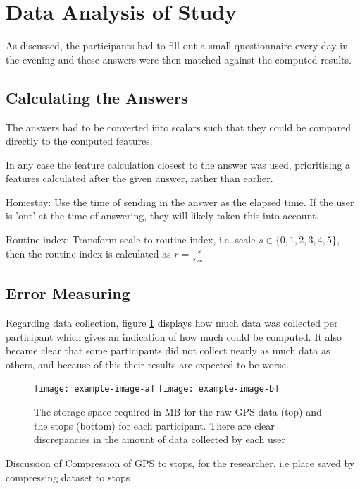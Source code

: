 \section{Data Analysis of Study}
As discussed, the participants had to fill out a small questionnaire every day in the evening and these answers were then matched against the computed results.

\subsection{Calculating the Answers}
The answers had to be converted into scalars such that they could be compared directly to the computed features. 

In any case the feature calculation closest to the answer was used, prioritising a features calculated after the given answer, rather than earlier.

Homestay: Use the time of sending in the answer as the elapsed time. If the user is 'out' at the time of answering, they will likely taken this into account.

Routine index: Transform scale to routine index, i.e. scale $s \in \{0, 1, 2, 3, 4, 5\}$, then the routine index is calculated as $r = \frac{s}{s_{max}}$



\subsection{Error Measuring}

Regarding data collection, figure \ref{fig:plot-megabytes} displays how much data was collected per participant which gives an indication of how much could be computed. It also became clear that some participants did not collect nearly as much data as others, and because of this their results are expected to be worse.


\begin{figure}
    \centering
    \texttt{[image: example-image-a]}
    \texttt{[image: example-image-b]}
    \caption{The storage space required in MB for the raw GPS data (top) and the stops (bottom) for each participant. There are clear discrepancies in the amount of data collected by each user}
    \label{fig:plot-megabytes}
\end{figure}

Discussion of Compression of GPS to stops, for the researcher. i.e place saved by compressing dataset to stops


